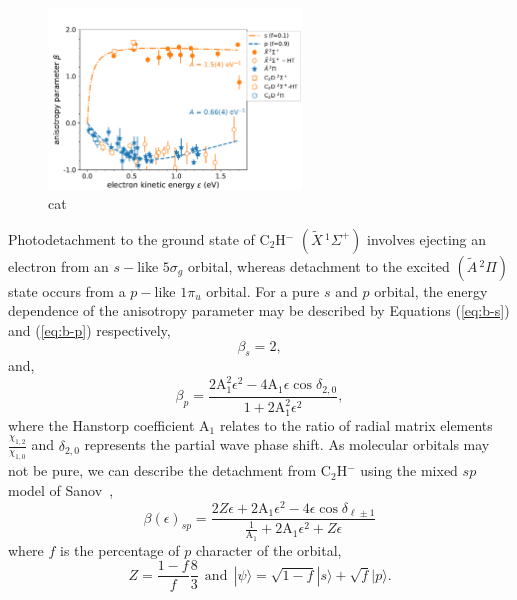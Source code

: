 \documentclass[journal=jpcafh,manuscript=article,layout=onecolumn, 12pt]{achemso}
\begin{document}
\begin{figure}
	\includegraphics[width=0.6\textwidth]{figures/PAD}
	\caption{cat}
	\label{fig:4}
\end{figure}

Photodetachment to the ground state of C$_2$H$^-$ $(\tilde{X}\,^1\Sigma^+)$ involves ejecting an electron from an $s-$like $5\sigma_g$ orbital, whereas detachment to the excited $(\tilde{A}\,^2\Pi)$ state occurs from a $p-$like $1\pi_u$ orbital.  For a pure $s$ and $p$ orbital, the energy dependence of the anisotropy parameter may be described by Equations (\ref{eq:b-s}) and (\ref{eq:b-p}) respectively,
\begin{equation}
\beta_s = 2,
\label{eq:b-s}
\end{equation}
and,
\begin{equation}
\beta_p = \frac{2\text{A}_1^2\epsilon^2-4\text{A}_1\epsilon\cos\delta_{2,0}}{1+2\text{A}_1^2\epsilon^2},
\label{eq:b-p}
\end{equation}
where the Hanstorp coefficient A$_1$ relates to the ratio of radial matrix elements $\frac{\chi_{1,2}}{\chi_{1,0}}$ and $\delta_{2,0}$ represents the partial wave phase shift. As molecular orbitals may not be pure, we can describe the detachment from C$_2$H$^-$ using the mixed $sp$ model of Sanov~\cite{san14},
\begin{equation}
\beta(\epsilon)_{sp} = \frac{2Z\epsilon+2\text{A}_1\epsilon^2-4\epsilon\cos\delta_{\ell\pm 1}}{\frac{1}{\text{A}_1}+2\text{A}_1\epsilon^2+Z\epsilon}
\label{eq:beta-sanov}
\end{equation}  
where $f$ is the percentage of $p$ character of the orbital,
\begin{equation}
Z = \frac{1-f}{f}\frac{8}{3}~~ \text{and} ~~ |\psi\rangle = \sqrt{1-f}|s\rangle + \sqrt{f}|p\rangle.
\end{equation}
\end{document}
